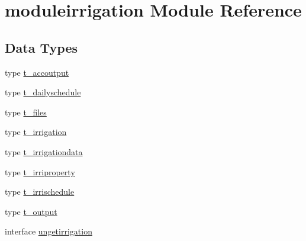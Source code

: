 \hypertarget{namespacemoduleirrigation}{}\section{moduleirrigation Module Reference}
\label{namespacemoduleirrigation}
\subsection*{Data Types}
\begin{DoxyCompactItemize}
\item 
type \mbox{\hyperlink{structmoduleirrigation_1_1t__accoutput}{t\+\_\+accoutput}}
\item 
type \mbox{\hyperlink{structmoduleirrigation_1_1t__dailyschedule}{t\+\_\+dailyschedule}}
\item 
type \mbox{\hyperlink{structmoduleirrigation_1_1t__files}{t\+\_\+files}}
\item 
type \mbox{\hyperlink{structmoduleirrigation_1_1t__irrigation}{t\+\_\+irrigation}}
\item 
type \mbox{\hyperlink{structmoduleirrigation_1_1t__irrigationdata}{t\+\_\+irrigationdata}}
\item 
type \mbox{\hyperlink{structmoduleirrigation_1_1t__irriproperty}{t\+\_\+irriproperty}}
\item 
type \mbox{\hyperlink{structmoduleirrigation_1_1t__irrischedule}{t\+\_\+irrischedule}}
\item 
type \mbox{\hyperlink{structmoduleirrigation_1_1t__output}{t\+\_\+output}}
\item 
interface \mbox{\hyperlink{interfacemoduleirrigation_1_1ungetirrigation}{ungetirrigation}}
\end{DoxyCompactItemize}
